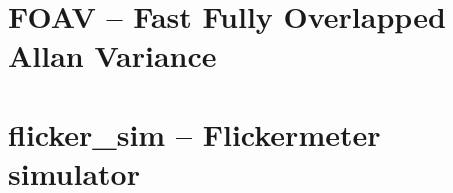 \documentclass[12pt,a4paper,oneside]{report} %
\begin{document}
\section*{\infosection} %

\section*{\examplesection} %

\resumecontents[maintoc]

\chapter{FOAV -- Fast Fully Overlapped Allan Variance} %
\stopcontents[maintoc]
\section*{\infosection} %

\section*{\examplesection} %

\resumecontents[maintoc]

\chapter{flicker\_sim -- Flickermeter simulator} %
\stopcontents[maintoc]
\section*{\infosection} %

\section*{\examplesection} %

\resumecontents[maintoc]
\end{document}
